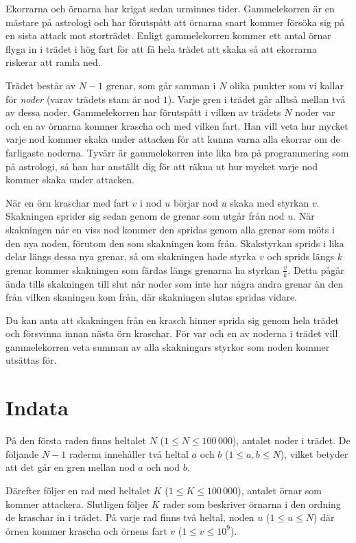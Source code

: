 Ekorrarna och örnarna har krigat sedan urminnes tider.
Gammelekorren är en mästare på astrologi och har förutspått att örnarna snart kommer försöka sig på en sista attack mot storträdet.
Enligt gammelekorren kommer ett antal örnar flyga in i trädet i hög fart för att få hela trädet att skaka så att ekorrarna riskerar att ramla ned.

Trädet består av $N - 1$ grenar, som går samman i $N$ olika punkter som vi kallar för \emph{noder} (varav trädets stam är nod $1$).
Varje gren i trädet går alltså mellan två av dessa noder.
Gammelekorren har förutspått i vilken av trädets $N$ noder var och en av örnarna kommer krascha och med vilken fart.
Han vill veta hur mycket varje nod kommer skaka under attacken för att kunna varna alla ekorrar om de farligaste noderna.
Tyvärr är gammelekorren inte lika bra på programmering som på astrologi, så han har anställt dig för att räkna ut hur mycket varje nod kommer skaka under attacken.

När en örn kraschar med fart $v$ i nod $u$ börjar nod $u$ skaka med styrkan $v$.
Skakningen sprider sig sedan genom de grenar som utgår från nod $u$.
När skakningen når en viss nod kommer den spridas genom alla grenar som möts i den nya noden, förutom den som skakningen kom från.
Skakstyrkan sprids i lika delar längs dessa nya grenar, så om skakningen hade styrka $v$ och sprids längs $k$ grenar kommer skakningen som färdas längs grenarna ha styrkan $\frac{v}{k}$.
Detta pågår ända tills skakningen till slut når noder som inte har några andra grenar än den från vilken skaningen kom från, där skakningen slutas spridas vidare.

Du kan anta att skakningen från en krasch hinner sprida sig genom hela trädet och försvinna innan nästa örn kraschar.
För var och en av noderna i trädet vill gammelekorren veta summan av alla skakningars styrkor som noden kommer utsättas för.

\section*{Indata}
På den första raden finns heltalet $N$ ($1 \le N \le 100\,000$), antalet noder i trädet.
De följande $N-1$ raderna innehåller två heltal $a$ och $b$ ($1 \le a,b \le N$), vilket betyder att det går en gren mellan nod $a$ och nod $b$.

Därefter följer en rad med heltalet $K$ ($1 \le K \le 100\,000$), antalet örnar som kommer attackera.
Slutligen följer $K$ rader som beskriver örnarna i den ordning de kraschar in i trädet.
På varje rad finns två heltal, noden $u$ ($1 \le u \le N$) där örnen kommer krascha och örnens fart $v$ ($1 \le v \le 10^9$).

